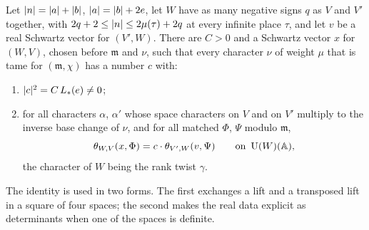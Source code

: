 \begin{theorem}\label{thm:exchange}
Let $\lvert n\rvert=\lvert a\rvert+\lvert b\rvert$, $\lvert a\rvert=\lvert b\rvert+2e$, let $W$ have as many negative signs $q$ as $V$ and $V'$ together, with $2q+2\le\lvert n\rvert\le2\mu(\tau)+2q$ at every infinite place $\tau$, and let $v$
be a real Schwartz vector for $(V',W)$. There are $C>0$ and a Schwartz vector $x$ for $(W,V)$, chosen before $\mathfrak m$ and $\nu$, such that every character $\nu$ of weight $\mu$ that is tame
for $(\mathfrak m,\chi)$ has a number $c$ with:
\begin{enumerate}[label=\textup{(\alph*)}]
\item $\lvert c\rvert^2=C\,L_*(e)\ne0$;
\item for all characters $\alpha$, $\alpha'$ whose space characters on $V$ and on $V'$ multiply to the inverse base change of $\nu$, and for all matched $\Phi$, $\Psi$ modulo $\mathfrak m$,
\[
  \theta_{W,V}(x,\Phi)=c\cdot\theta_{V',W}(v,\Psi)\qquad\text{on }\operatorname{U}(W)(\mathbb{A}),
\]
the character of $W$ being the rank twist $\gamma$.
\end{enumerate}
\end{theorem}

The identity is used in two forms. The first exchanges a lift and a transposed lift in a square of four spaces; the second makes the real data explicit as
determinants when one of the spaces is definite.

